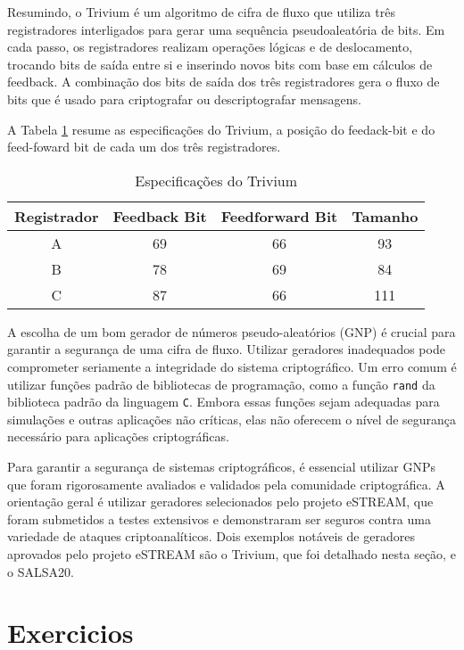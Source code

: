 Resumindo, o Trivium é um algoritmo de cifra de fluxo que utiliza três registradores interligados para gerar uma sequência pseudoaleatória de bits.
Em cada passo, os registradores realizam operações lógicas e de deslocamento, trocando bits de saída entre si e inserindo novos bits com base em cálculos de feedback.
A combinação dos bits de saída dos três registradores gera o fluxo de bits que é usado para criptografar ou descriptografar mensagens.

A Tabela \ref{tab:trivium} resume as especificações do Trivium, a posição do feedack-bit e do feed-foward bit de cada um dos três registradores.

\begin{table}[h!]
  \label{tab:trivium}
\centering
\begin{tabular}{|c|c|c|c|}
\hline
\textbf{Registrador} & \textbf{Feedback Bit} & \textbf{Feedforward Bit} & \textbf{Tamanho} \\
\hline
A & 69 & 66 & 93 \\
\hline
B & 78 & 69 & 84 \\
\hline
C & 87 & 66 & 111 \\
\hline
\end{tabular}
\caption{Especificações do Trivium}
\end{table}

A escolha de um bom gerador de números pseudo-aleatórios (GNP) é crucial para garantir a segurança de uma cifra de fluxo.
Utilizar geradores inadequados pode comprometer seriamente a integridade do sistema criptográfico.
Um erro comum é utilizar funções padrão de bibliotecas de programação, como a função \texttt{rand} da biblioteca padrão da linguagem \texttt{C}.
Embora essas funções sejam adequadas para simulações e outras aplicações não críticas, elas não oferecem o nível de segurança necessário para aplicações criptográficas.

Para garantir a segurança de sistemas criptográficos, é essencial utilizar GNPs que foram rigorosamente avaliados e validados pela comunidade criptográfica.
A orientação geral é utilizar geradores selecionados pelo projeto eSTREAM, que foram submetidos a testes extensivos e demonstraram ser seguros contra uma variedade de ataques criptoanalíticos.
Dois exemplos notáveis de geradores aprovados pelo projeto eSTREAM são o Trivium, que foi detalhado nesta seção, e o SALSA20.


\section{Exercicios}
\label{sec:exercicios}

